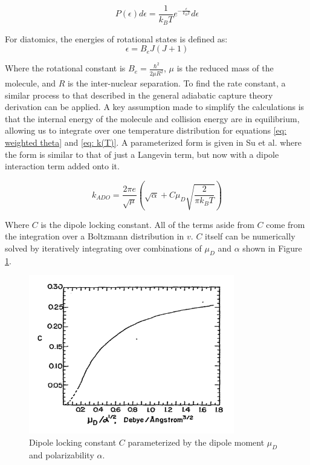 \begin{equation*}
    P(\epsilon) d\epsilon = \frac{1}{k_BT}e^{-\frac{\epsilon}{k_BT}}d\epsilon
\end{equation*}

For diatomics, the energies of rotational states is defined as:
\begin{equation*}
    \epsilon = B_e J(J+1)
\end{equation*}

Where the rotational constant is $B_e=\frac{\hbar^2}{2\mu R^2}$, $\mu$ is the reduced mass of the molecule, and $R$ is the inter-nuclear separation. To find the rate constant, a similar process to that described in the general adiabatic capture theory derivation can be applied. A key assumption made to simplify the calculations is that the internal energy of the molecule and collision energy are in equilibrium, allowing us to integrate over one temperature distribution for equations \ref{eq: weighted theta} and \ref{eq: k(T)}. A parameterized form is given in Su et al. where the form is similar to that of just a Langevin term, but now with a dipole interaction term added onto it.\cite{Su1973}

\begin{equation}
    k_{ADO} = \frac{2 \pi e}{\sqrt{\mu}}\left(\sqrt{\alpha}+C \mu_D\sqrt{\frac{2}{\pi k_B T}}\right)
    \label{eq: k ADO}
\end{equation}

Where $C$ is the dipole locking constant. All of the terms aside from $C$ come from the integration over a Boltzmann distribution in $v$. $C$ itself can be numerically solved by iteratively integrating over combinations of $\mu_D$ and $\alpha$ shown in Figure \ref{fig: C}.\cite{Su1973}\cite{Troe1985}

\begin{figure}[H]
	\label{fig: C}
	\centering
	\includegraphics[width=0.8\textwidth]{images/ADO_C.pdf}
	\caption{Dipole locking constant $C$ parameterized by the dipole moment $\mu_D$ and polarizability $\alpha$.\cite{Su1973}}
\end{figure}
